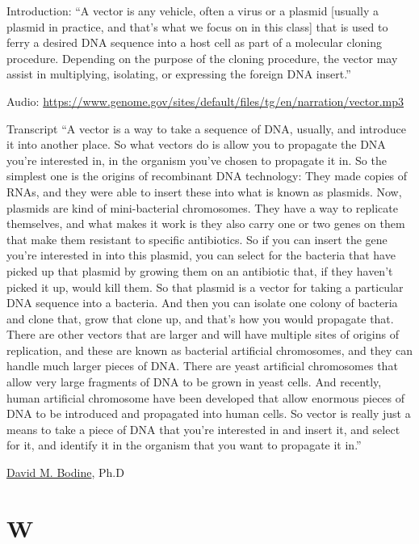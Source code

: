 \documentclass[
]{book}
\begin{document}
Introduction: ``A vector is any vehicle, often a virus or a plasmid {[}usually a plasmid in practice, and that's what we focus on in this class{]} that is used to ferry a desired DNA sequence into a host cell as part of a molecular cloning procedure. Depending on the purpose of the cloning procedure, the vector may assist in multiplying, isolating, or expressing the foreign DNA insert.''

Audio: \url{https://www.genome.gov/sites/default/files/tg/en/narration/vector.mp3}

Transcript
``A vector is a way to take a sequence of DNA, usually, and introduce it into another place. So what vectors do is allow you to propagate the DNA you're interested in, in the organism you've chosen to propagate it in. So the simplest one is the origins of recombinant DNA technology: They made copies of RNAs, and they were able to insert these into what is known as plasmids. Now, plasmids are kind of mini-bacterial chromosomes. They have a way to replicate themselves, and what makes it work is they also carry one or two genes on them that make them resistant to specific antibiotics. So if you can insert the gene you're interested in into this plasmid, you can select for the bacteria that have picked up that plasmid by growing them on an antibiotic that, if they haven't picked it up, would kill them. So that plasmid is a vector for taking a particular DNA sequence into a bacteria. And then you can isolate one colony of bacteria and clone that, grow that clone up, and that's how you would propagate that. There are other vectors that are larger and will have multiple sites of origins of replication, and these are known as bacterial artificial chromosomes, and they can handle much larger pieces of DNA. There are yeast artificial chromosomes that allow very large fragments of DNA to be grown in yeast cells. And recently, human artificial chromosome have been developed that allow enormous pieces of DNA to be introduced and propagated into human cells. So vector is really just a means to take a piece of DNA that you're interested in and insert it, and select for it, and identify it in the organism that you want to propagate it in.''

\href{https://www.genome.gov/staff/David-M-Bodine-PhD}{David M. Bodine}, Ph.D

\hypertarget{w}{%
\chapter{W}\label{w}}
\end{document}
